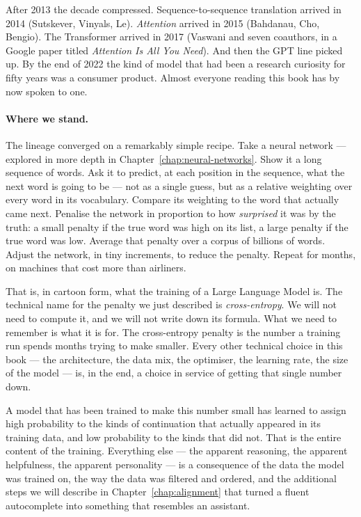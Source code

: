 After 2013 the decade compressed. Sequence-to-sequence
translation arrived in 2014 (Sutskever, Vinyals, Le).
\emph{Attention} arrived in 2015 (Bahdanau, Cho, Bengio). The
Transformer arrived in 2017 (Vaswani and seven coauthors, in a
Google paper titled \emph{Attention Is All You Need}). And then
the GPT line picked up. By the end of 2022 the kind of model
that had been a research curiosity for fifty years was a
consumer product. Almost everyone reading this book has by now
spoken to one.

\paragraph{Where we stand.} The lineage converged on a remarkably simple recipe. Take a
neural network --- explored in more depth in Chapter~\ref{chap:neural-networks}.
Show it a long sequence of words. Ask it to predict, at each
position in the sequence, what the next word is going to be ---
not as a single guess, but as a relative weighting over every
word in its vocabulary. Compare its weighting to the word that
actually came next. Penalise the network in proportion to how
\emph{surprised} it was by the truth: a small penalty if the true
word was high on its list, a large penalty if the true word was
low. Average that penalty over a corpus of billions of words.
Adjust the network, in tiny increments, to reduce the penalty.
Repeat for months, on machines that cost more than airliners.

That is, in cartoon form, what the training of a Large Language
Model is. The technical name for the penalty we just described is
\emph{cross-entropy}. We will not need to compute it, and we will
not write down its formula. What we need to remember is what it
is for. The cross-entropy penalty is the number a training run
spends months trying to make smaller. Every other technical
choice in this book --- the architecture, the data mix, the
optimiser, the learning rate, the size of the model --- is, in
the end, a choice in service of getting that single number down.

A model that has been trained to make this number small has
learned to assign high probability to the kinds of continuation
that actually appeared in its training data, and low probability
to the kinds that did not. That is the entire content of the
training. Everything else --- the apparent reasoning, the
apparent helpfulness, the apparent personality --- is a
consequence of the data the model was trained on, the way the
data was filtered and ordered, and the additional steps we will
describe in Chapter~\ref{chap:alignment} that turned a fluent autocomplete into
something that resembles an assistant.

